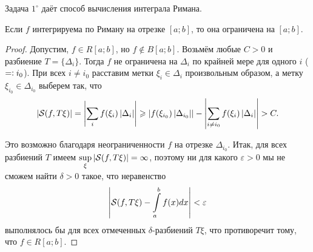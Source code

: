 Задача $1^\circ$ даёт способ вычисления интеграла Римана.

\begin{proposal}
    Если $f$ интегрируема по Риману на отрезке $[a; b]$, то она ограничена на $[a; b]$.
\end{proposal}

\begin{proof}
    Допустим, $f \in R[a; b]$, но $f \notin B[a; b]$. Возьмём любые $C > 0$ и разбиение $T = \{\Delta_i\}$. Тогда $f$ не ограничена на $\Delta_i$ по крайней мере для одного $i$ ($=\vcentcolon i_0$). При всех $i \ne i_0$ расставим метки $\xi_i \in \Delta_i$ произвольным образом, а метку $\xi_{i_0} \in \Delta_{i_0}$ выберем так, что
    \[
        \left\lvert\mathcal{S}(f, T\xi)\right\rvert = \left\lvert\sum_if(\xi_i)\left\lvert\Delta_i\right\rvert\right\rvert \geqslant \left\lvert f(\xi_{i_0})\left\lvert\Delta_{i_0}\right\rvert\right\rvert - \left\lvert\sum_{i \ne i_0}f(\xi_i)\left\lvert\Delta_i\right\rvert\right\rvert > C.
    \]

    Это возможно благодаря неограниченности $f$ на отрезке $\Delta_{i_0}$. Итак, для всех разбиений $T$ имеем $\sup\limits_\xi\left\lvert\mathcal{S}(f, T\xi)\right\rvert = \infty$, поэтому ни для какого $\varepsilon > 0$ мы не сможем найти $\delta > 0$ такое, что неравенство \[\displaystyle\left\lvert\mathcal{S}(f, T\xi) - \int\limits_a^bf(x)dx\right\rvert < \varepsilon\] выполнялось бы для всех отмеченных $\delta$-разбиений $T\xi$, что противоречит тому, что $f \in R[a; b]$.
\end{proof}


